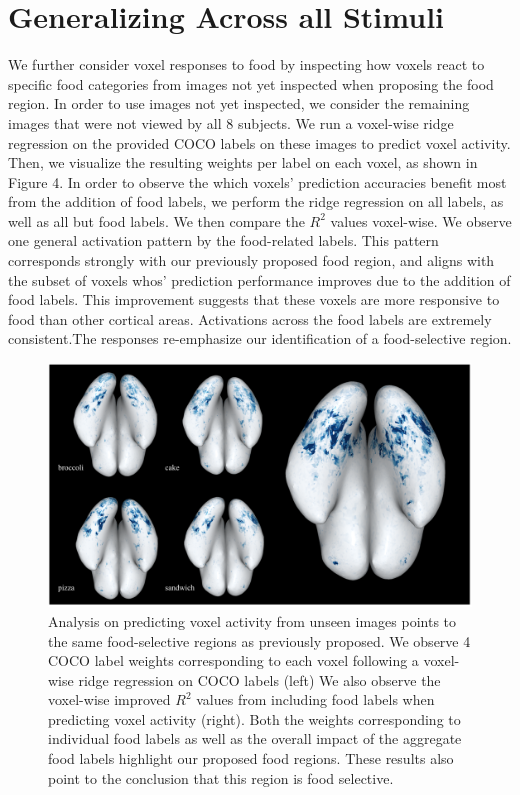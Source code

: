 \documentclass[../thesis.tex]{subfiles}
\begin{document}
\section{Generalizing Across all Stimuli}
We further consider voxel responses to food by inspecting how voxels react to specific food categories from images not yet inspected when proposing the food region. In order to use images not yet inspected, we consider the remaining images that were not viewed by all 8 subjects. We run a voxel-wise ridge regression on the provided COCO labels on these images to predict voxel activity. Then, we visualize the resulting weights per label on each voxel, as shown in Figure 4. In order to observe the which voxels' prediction accuracies benefit most from the addition of food labels, we perform the ridge regression on all labels, as well as all but food labels. We then compare the $R^{2}$ values voxel-wise. We observe one general activation pattern by the food-related labels. This pattern corresponds strongly with our previously proposed food region, and aligns with the subset of voxels whos' prediction performance improves due to the addition of food labels. This improvement suggests that these voxels are more responsive to food than other cortical areas. Activations across the food labels are extremely consistent.The responses re-emphasize our identification of a food-selective region. 
    \begin{figure}
        \centering
        \includegraphics[scale=0.45]{fig4.png}
            \caption{Analysis on predicting voxel activity from unseen images points to the same food-selective regions as previously proposed. We observe 4 COCO label weights corresponding to each voxel following a voxel-wise ridge regression on COCO labels (left) We also observe the voxel-wise improved $R^{2}$ values from including food labels when predicting voxel activity (right). Both the weights corresponding to individual food labels as well as the overall impact of the aggregate food labels highlight our proposed food regions. These results also point to the conclusion that this region is food selective.} \label{fig1}
    \end{figure}
 
\end{document}

